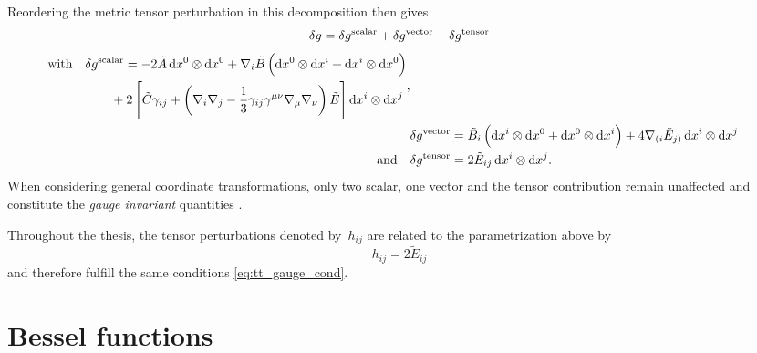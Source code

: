 Reordering the metric tensor perturbation in this decomposition then gives
\begin{equation}
	\delta g = \delta g^{\mathrm{scalar}} + \delta g^{\mathrm{vector}} + \delta g^{\mathrm{tensor}} \\
\end{equation}
\begin{align}
	\begin{split}
	\text{with} \quad &\delta g^{\mathrm{scalar}} = -2\tilde{A} \dxdx{0}{0} + \covd_i\tilde{B}\del{\dxdx{0}{i} + \dxdx{i}{0}} \\
		&\qquad + 2\sbr{\tilde{C}\gamma_{ij} + \del{\covd_i\covd_j-\frac{1}{3}\gamma_{ij}\gamma^{\mu\nu}\covd_\mu\covd_\nu}\tilde{E}}\dxdx{i}{j}
	\end{split} \eqpunct{,} \\
	&\delta g^{\mathrm{vector}} = \tilde{B}_i\del{\dxdx{i}{0} + \dxdx{0}{i}} + 4 \covd_{(i}\tilde{E}_{j)}\dxdx{i}{j} \\
	\text{and} \quad &\delta g^{\mathrm{tensor}} = 2 \tilde{E}_{ij}\dxdx{i}{j}
	\eqpunct{.}
\end{align}
When considering general coordinate transformations, only two scalar, one vector and the tensor contribution remain unaffected and constitute the \emph{gauge invariant} quantities \autocite{Schuller,Weinberg}.

Throughout the thesis, the tensor perturbations denoted by~\(h_{ij}\) are related to the parametrization above by
\begin{equation}
	h_{ij} = 2 \tilde{E}_{ij}
\end{equation}
and therefore fulfill the same conditions \eqref{eq:tt_gauge_cond}.


\section{Bessel functions}\label{app:bessel}

